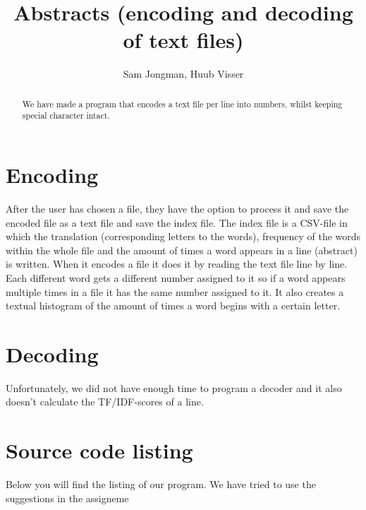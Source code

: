 \documentclass{article}
\begin{document}
\title{Abstracts (encoding and decoding of text files){}}
\author{Sam Jongman, Huub Visser}

\maketitle

\begin{abstract}
We have made a program that encodes a text file per line into numbers, whilst keeping special character intact. 
\end{abstract}

\section{Encoding}
After the user has chosen a file, they have the option to process it and save the encoded file as a text file and save the index file. The index file is a CSV-file in which the translation (corresponding letters to the words), frequency of the words within the whole file and the amount of times a word appears in a line (abstract) is written. When it encodes a file it does it by reading the text file line by line. Each different word gets a different number assigned to it so if a word appears multiple times in a file it has the same number assigned to it. It also creates a textual histogram of the amount of times a word begins with a certain letter.

\section{Decoding}
Unfortunately, we did not have enough time to program a decoder and it also doesn’t calculate the TF/IDF-scores of a line. 

\section{Source code listing}
Below you will find the listing of our program. We have tried to use the suggestions in the assigneme
\end{document}

